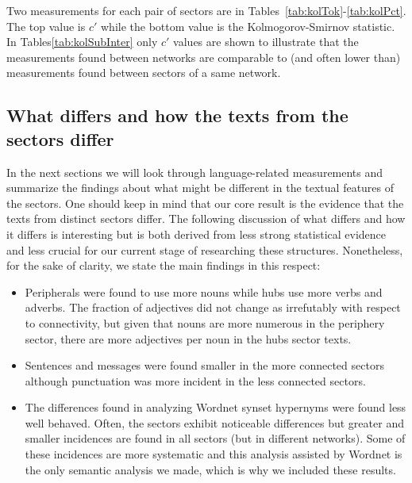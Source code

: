 \documentclass[review]{elsarticle}
\begin{document}
Two measurements for each pair of sectors are in Tables~\ref{tab:kolTok}-\ref{tab:kolPct}.
 The top value is $c'$ while the bottom value is the Kolmogorov-Smirnov statistic.
 In Tables\ref{tab:kolSubInter} only $c'$ values are shown to illustrate
 that the measurements found between networks are comparable to (and often lower than) measurements found between sectors of a same network.
 

 
 

\subsection{What differs and how the texts from the sectors differ}
 In the next sections we will look through language-related measurements
 and summarize the findings about what might be different in
 the textual features of the sectors.
 One should keep in mind that our core result is the evidence that
 the texts from distinct sectors differ.
 The following discussion of what differs and how it differs
 is interesting but is both derived from less strong statistical evidence and less crucial for our current stage of researching these structures.
 Nonetheless, for the sake of clarity, we state the main findings in this respect:
 \begin{itemize}
\item Peripherals were found to use more nouns while hubs use more verbs and adverbs. The fraction of adjectives did not change as irrefutably with respect to connectivity, but given that nouns are more numerous in the periphery sector, there are more adjectives per noun in the hubs sector texts.
\item Sentences and messages were found smaller in the more connected sectors although punctuation was more incident in the less connected sectors.
\item The differences found in analyzing Wordnet synset hypernyms were found less well behaved. Often, the sectors exhibit noticeable differences but greater and smaller incidences are found in all sectors (but in different networks). Some of these incidences are more systematic and this analysis assisted by Wordnet is the only semantic analysis we made, which is why we included these results.
\end{itemize}
\end{document}
